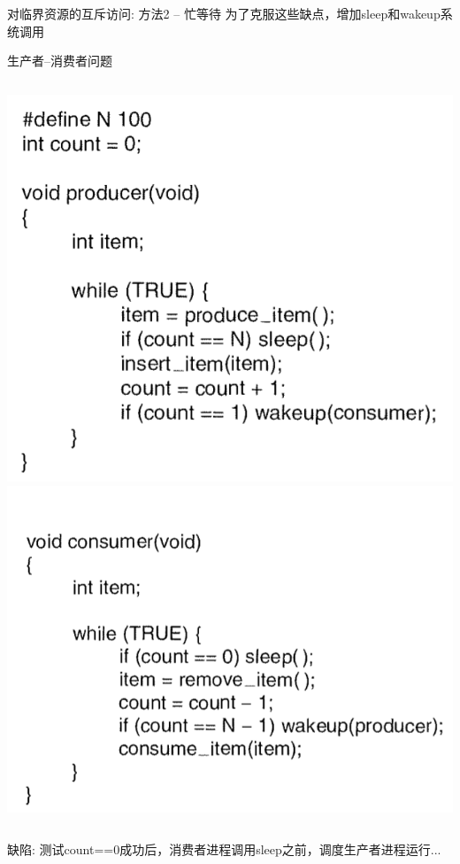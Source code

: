 \documentclass[xcolor=svgnames]{beamer}
\begin{document}
\begin{CJK*}{UTF8}{gbsn}
\begin{frame}{对临界资源的互斥访问: 方法2 -- 忙等待}
为了克服这些缺点，增加sleep和wakeup系统调用
\end{frame}

\begin{frame}{生产者--消费者问题}
\begin{columns}[b]
\includegraphics[width=1.0\textwidth]{prod.png}
\includegraphics[width=1.0\textwidth]{consum.png}
\end{columns}%

缺陷: 测试count==0成功后，消费者进程调用sleep之前，调度生产者进程运行...
\end{frame}

\end{CJK*}
\end{document}
